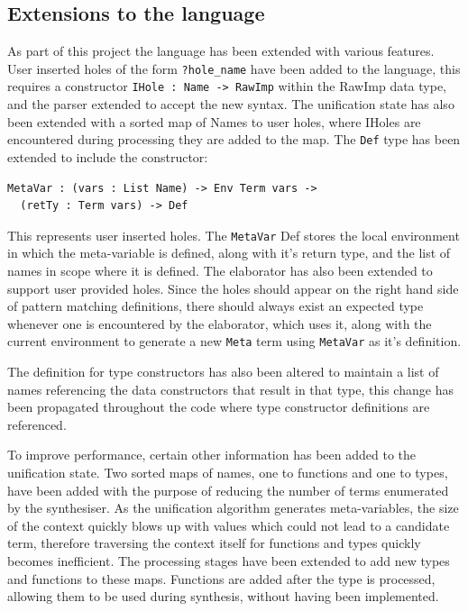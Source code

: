 \documentclass[a4paper]{article}
\begin{document}
\subsection{Extensions to the language}
\label{sec:org92a89c9}
As part of this project the language has been extended with various features.
User inserted holes of the form \texttt{?hole\_name} have been added to the language,
this requires a constructor \texttt{IHole : Name -> RawImp} within the RawImp 
data type, and the parser extended to accept the new syntax. The 
unification state has also been extended with a sorted map of Names
to user holes, where IHoles are encountered during processing they are 
added to the map. The \texttt{Def} type has been extended to include the 
constructor:

\begin{center}
\begin{verbatim}
MetaVar : (vars : List Name) -> Env Term vars ->
  (retTy : Term vars) -> Def
\end{verbatim}
\end{center}


This represents user inserted holes. The \texttt{MetaVar} Def stores the local
environment in which the meta-variable is defined, along with it's
return type, and the list of names in scope where it is defined. The elaborator has also been
extended to support user provided holes. Since the holes should
appear on the right hand side of pattern matching definitions,
there should always exist an expected type whenever one is encountered by the elaborator, which
uses it, along with the current environment to generate a new \texttt{Meta} term using \texttt{MetaVar}
as it's definition.

The definition for type constructors has also been altered to maintain a list of names referencing
the data constructors that result in that type, this change has been propagated throughout the code
where type constructor definitions are referenced.

To improve performance, certain other information has been added to the unification state. Two sorted
maps of names, one to functions and one to types, have been added
with the purpose of reducing the number of terms enumerated by the synthesiser. As the unification algorithm 
generates meta-variables, the size of the context quickly blows up with values which could not lead to a candidate
term, therefore traversing the context itself for functions and types quickly becomes inefficient.
The processing stages have been extended to add new types and functions to these maps. Functions are added 
after the type is processed, allowing them to be used during synthesis, without having been implemented. 
\end{document}
